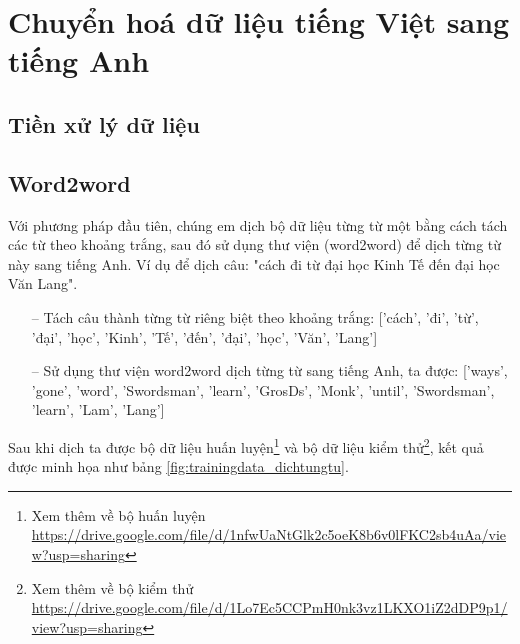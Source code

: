 \section{Chuyển hoá dữ liệu tiếng Việt sang tiếng Anh}
\subsection{Tiền xử lý dữ liệu}

\subsection{Word2word}

Với phương pháp đầu tiên, chúng em dịch bộ dữ liệu từng từ một bằng cách tách các từ theo khoảng trắng, sau đó sử dụng thư viện (word2word) để dịch từng từ này sang tiếng Anh. Ví dụ để dịch câu: "cách đi từ đại học Kinh Tế đến đại học Văn Lang".
\begin{itemize}
    \item[--] Tách câu thành từng từ riêng biệt theo khoảng trắng: ['cách', 'đi', 'từ', 'đại', 'học', 'Kinh', 'Tế', 'đến', 'đại', 'học', 'Văn', 'Lang']
    \item[--] Sử dụng thư viện word2word dịch từng từ sang tiếng Anh, ta được: ['ways', 'gone', 'word', 'Swordsman', 'learn', 'GrosDs', 'Monk', 'until', 'Swordsman', 'learn', 'Lam', 'Lang']
\end{itemize}

Sau khi dịch ta được bộ dữ liệu huấn luyện\footnote{Xem thêm về bộ huấn luyện \url{https://drive.google.com/file/d/1nfwUaNtGlk2c5oeK8b6v0lFKC2sb4uAa/view?usp=sharing}} và bộ dữ liệu kiểm thử\footnote{Xem thêm về bộ kiểm thử \url{https://drive.google.com/file/d/1Lo7Ec5CCPmH0nk3vz1LKXO1iZ2dDP9p1/view?usp=sharing}}, kết quả được minh họa như bảng \ref{fig:trainingdata_dichtungtu}.


